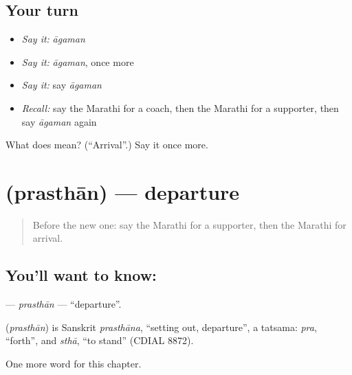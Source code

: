\subsection*{Your turn}
\begin{itemize}
\raggedright
  \item \emph{Say it:} \emph{āgaman}
  \item \emph{Say it:} \emph{āgaman}, once more
  \item \emph{Say it:} say \emph{āgaman}
  \item \emph{Recall:} say the Marathi for a coach, then the Marathi for a supporter, then say \emph{āgaman} again
\end{itemize}

\begin{tcolorbox}[breakable,colback=teal!4,colframe=teal!35!black,title={Before you move on}]
What does  mean? (\textquotedblleft{}Arrival\textquotedblright{}.) Say it once more.
\end{tcolorbox}
\section[\texorpdfstring{\mr{प्रस्थान} (prasthān)}{प्रस्थान (prasthān)}]{ (prasthān) — departure}

\label{lesson:MR-C215-prasthan}



\begin{quote}
Before the new one: say the Marathi for a supporter, then the Marathi for arrival.
\end{quote}

\subsection*{You'll want to know: }
\textbf{} — \emph{prasthān} — \textquotedblleft{}departure\textquotedblright{}.

\begin{cousinweb}
\textbf{} (\emph{prasthān}) is Sanskrit \emph{prasthāna}, \textquotedblleft{}setting out, departure\textquotedblright{}, a tatsama: \emph{pra}, \textquotedblleft{}forth\textquotedblright{}, and \emph{sthā}, \textquotedblleft{}to stand\textquotedblright{} (CDIAL 8872).
\end{cousinweb}

\begin{grammarlens}[title={What you've built}]
One more word for this chapter.
\end{grammarlens}

